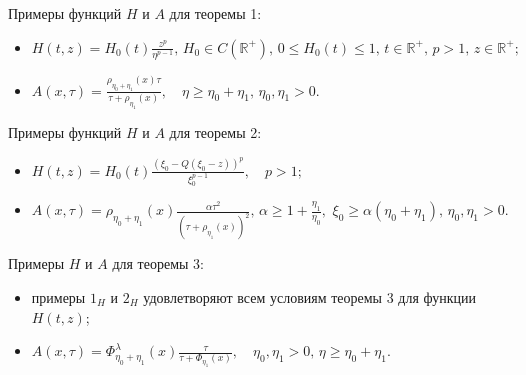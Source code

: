 \smallskip




Примеры функций $H$ и $A$ для теоремы 1:

\begin{itemize}

\item[$1_{H})$]

$\displaystyle  H(t,z)=H_0(t)\frac{z^p}{\eta^{p-1}},\,H_0\in C(\mathbb{R}^+),\,0\leq H_0(t)\leq 1,\,t\in \mathbb{R}^+,\,p>1,\,z\in\mathbb{R}^{+};$

\item[$1_{A})$]

$\displaystyle A(x,\tau)=\frac{\rho_{\eta_0+\eta_1}(x)\tau}{\tau+\rho_{\eta_1}(x)},\quad \eta\geq\eta_0+\eta_1,\,\eta_0,\eta_1>0.$

\end{itemize}



\smallskip



Примеры функций $H$ и $A$ для теоремы 2:

\begin{itemize}

\item[$2_{H})$]

$\displaystyle H(t,z)=H_0(t)\frac{(\xi_0-Q(\xi_0-z))^p}{\xi_0^{p-1}},\quad p>1;$

\item[$2_{A})$]

$\displaystyle A(x,\tau)=\rho_{\eta_0+\eta_1}(x)\frac{\alpha\tau^2}{(\tau+\rho_{\eta_1}(x))^2},\,\alpha\geq1+\frac{\eta_1}{\eta_0},\,\,\xi_0\geq\alpha(\eta_0+\eta_1),\,\eta_0,\eta_1>0.$

\end{itemize}



\smallskip



Примеры $H$ и $A$ для теоремы 3:

\begin{itemize}

\item[$3_{H})$] примеры $1_{H}$ и $2_{H}$ удовлетворяют всем условиям теоремы 3 для функции $H(t,z)$;



\item[$3_{A})$] 

$\displaystyle  A(x,\tau)=\Phi_{\eta_0+\eta_1}^{\lambda}(x)\frac{\tau}{\tau+\Phi_{\eta_1}(x)},

\quad \eta_0,\eta_1>0,\,\eta\geq\eta_0+\eta_1.$

\end{itemize}



